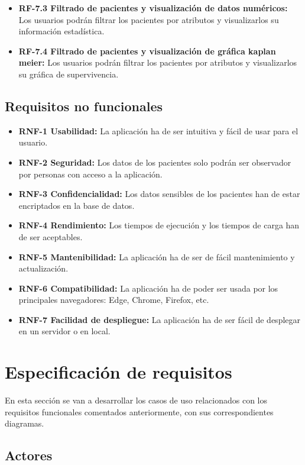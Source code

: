 \begin{itemize}
\begin{itemize}
	    \item \textbf{RF-7.3 Filtrado de pacientes y visualización de datos numéricos:} Los usuarios podrán filtrar los pacientes por atributos y visualizarlos su información estadística.
	    \item \textbf{RF-7.4 Filtrado de pacientes y visualización de gráfica kaplan meier:} Los usuarios podrán filtrar los pacientes por atributos y visualizarlos su gráfica de supervivencia.
	\end{itemize}
\end{itemize}

\subsection{Requisitos no funcionales}

\begin{itemize}
    \item \textbf{RNF-1 Usabilidad:} La aplicación ha de ser intuitiva y fácil de usar para el usuario.
    \item \textbf{RNF-2 Seguridad:} Los datos de los pacientes solo podrán ser observador por personas con acceso a la aplicación.
    \item \textbf{RNF-3 Confidencialidad:} Los datos sensibles de los pacientes han de estar encriptados en la base de datos.
    \item \textbf{RNF-4 Rendimiento:} Los tiempos de ejecución y los tiempos de carga han de ser aceptables.
    \item \textbf{RNF-5 Mantenibilidad:} La aplicación ha de ser de fácil mantenimiento y actualización.
    \item \textbf{RNF-6 Compatibilidad:} La aplicación ha de poder ser usada por los principales navegadores: Edge, Chrome, Firefox, etc.
    \item \textbf{RNF-7 Facilidad de despliegue:} La aplicación ha de ser fácil de desplegar en un servidor o en local.
\end{itemize}

\section{Especificación de requisitos}

En esta sección se van a desarrollar los casos de uso relacionados con los requisitos funcionales comentados anteriormente, con sus correspondientes diagramas.

\subsection{Actores}

